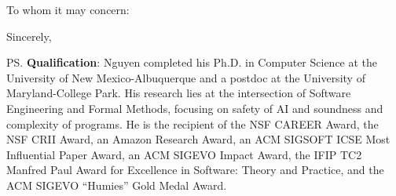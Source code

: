\documentclass[11pt]{letter}
\begin{document}
\begin{letter}{
  }

  \date{\textbf{\today}}
  \opening{To whom it may concern:}
  
  \lipsum[2-8]

  \closing{Sincerely,}


  \ps{\textbf{Qualification}: Nguyen completed his Ph.D. in Computer Science at the University of New Mexico-Albuquerque and a postdoc at the University of Maryland-College Park. His research lies at the intersection of Software Engineering and Formal Methods, focusing on safety of AI and soundness and complexity of programs. He is the recipient of the NSF CAREER Award, the NSF CRII Award, an Amazon Research Award, an ACM SIGSOFT ICSE Most Influential Paper Award, an ACM SIGEVO Impact Award, the IFIP TC2 Manfred Paul Award for Excellence in Software: Theory and Practice, and the ACM SIGEVO ``Humies'' Gold Medal Award.}
\end{letter}
\end{document}
